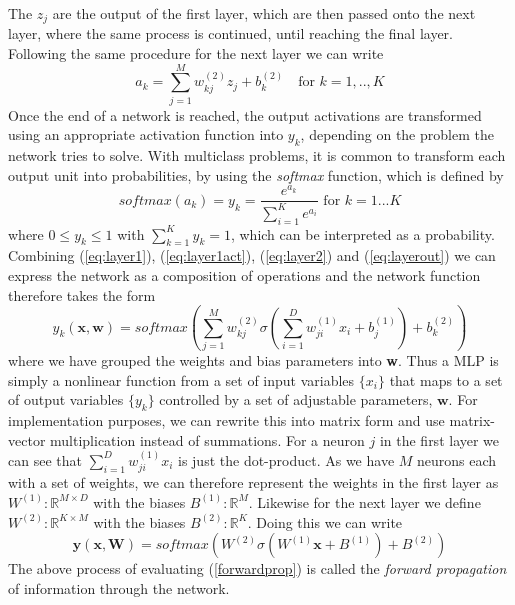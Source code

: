 The $z_j$ are the output of the first layer, which are then passed onto the next
layer, where the same process is continued, until reaching the final layer.
Following the same procedure for the next layer we can write
\begin{equation}
\label{eq:layer2}
a_k =  \sum_{j=1}^{M} w_{kj}^{(2)}z_j + b^{(2)}_{k} \quad \text{for } k = 1,..,K
\end{equation}
Once the end of a network is reached, the output activations are transformed
using an appropriate activation function into $y_k$, depending on the problem
the network tries to solve. With multiclass problems, it is common to transform
each output unit into probabilities, by using the \emph{softmax} function, which
is defined by
\begin{equation}
\label{eq:layerout}
softmax(a_k) = y_k = \frac{e^{a_k}}{\sum^K_{i = 1} e^{a_i}} \text{ for } k =
1...K
\end{equation}
where $0 \leq y_k \leq 1$ with $\sum^K_{k=1} y_k = 1$, which can be interpreted
as a probability.
Combining (\ref{eq:layer1}), (\ref{eq:layer1act}), (\ref{eq:layer2}) and
(\ref{eq:layerout}) we can express the network as a composition of operations
and the network function therefore takes the form\label{sec:forward}
\begin{equation}
y_k (\textbf{x}, \textbf{w}) = softmax \left ( \sum_{j=1}^{M} w_{kj}^{(2)}
\sigma \left( \sum_{i=1}^{D} w_{ji}^{(1)}x_i + b^{(1)}_{j} \right) + b^{(2)}_{k}
\right) 
\end{equation}
where we have grouped the weights and bias parameters into \textbf{w}. 
Thus a MLP is simply a nonlinear function from a set of input variables
$\{x_i\}$ that maps to a set of output variables $\{y_k\}$ controlled by a set
of adjustable parameters, $\textbf{w}$. For implementation purposes, we can
rewrite this into matrix form and use matrix-vector multiplication instead of
summations. For a neuron $j$ in the first layer we can see that $\sum_{i=1}^{D}
w_{ji}^{(1)}x_i$ is just the dot-product. As we have $M$ neurons each with a set
of weights, we can therefore represent the weights in the first layer as
$W^{(1)}: \mathbb{R}^{M \times D}$ with the biases $B^{(1)}:\mathbb{R}^{M}$.
Likewise for the next layer we define $W^{(2)}: \mathbb{R}^{K \times M}$ with
the biases $B^{(2)}:\mathbb{R}^{K}$. Doing this we can write
\begin{equation}
\textbf{y} (\textbf{x}, \textbf{W}) = softmax \left (W^{(2)} \sigma
\left(W^{(1)} \textbf{x} + B^{(1)} \right) + B^{(2)} \right)
\label{forwardprop}
\end{equation}
The above process of evaluating (\ref{forwardprop}) is called the \emph{forward
	propagation} of information through the network. 


